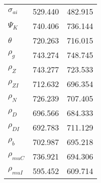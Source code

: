 \begin{center}
\begin{longtable}{lcc}
$ {\sigma_{ai}}        $	 & 	     529.440	 & 	     482.915 \\ 
$ {\Psi_{K}}           $	 & 	     740.406	 & 	     736.144 \\ 
$ {\theta}             $	 & 	     720.263	 & 	     716.015 \\ 
$ {\rho_g}             $	 & 	     743.274	 & 	     748.745 \\ 
$ {\rho_Z}             $	 & 	     743.277	 & 	     723.533 \\ 
$ {\rho_{ZI}}          $	 & 	     712.632	 & 	     696.354 \\ 
$ {\rho_N}             $	 & 	     726.239	 & 	     707.405 \\ 
$ {\rho_D}             $	 & 	     696.566	 & 	     684.333 \\ 
$ {\rho_{DI}}          $	 & 	     692.783	 & 	     711.129 \\ 
$ {\rho_b}             $	 & 	     702.987	 & 	     695.218 \\ 
$ {\rho_{muC}}         $	 & 	     736.921	 & 	     694.306 \\ 
$ {\rho_{muI}}         $	 & 	     595.452	 & 	     609.714 \\ 
\end{longtable}
 \end{center}
